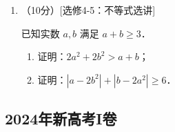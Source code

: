 \begin{description}
\begin{enumerate}[leftmargin=5pt]
        \item （10分）[选修4-5：不等式选讲]

        已知实数 $a,b$ 满足 $a+b\geqslant3$．

        \begin{enumerate}[label=(\arabic*)]
            \item 证明：$2a^2+2b^2>a+b$；
            \item 证明：$|a-2b^2|+|b-2a^2|\geqslant6$．
        \end{enumerate}
    \end{enumerate}
\end{description}
\clearpage


\subsection{2024年新高考I卷}\label{gk:2024年新高考I卷}

